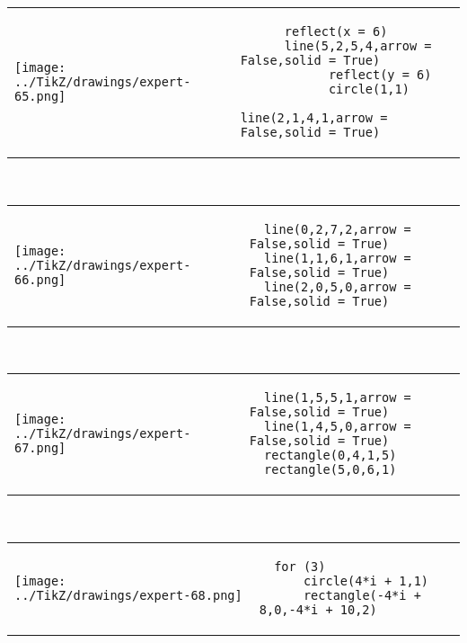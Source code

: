             \begin{tabular}{ll}
    \texttt{[image: ../TikZ/drawings/expert-65.png]}&
    
        \begin{minipage}{10cm}
        \begin{verbatim}
      reflect(x = 6)
      line(5,2,5,4,arrow = False,solid = True)
            reflect(y = 6)
            circle(1,1)
            line(2,1,4,1,arrow = False,solid = True)
        \end{verbatim}
\end{minipage}

    \end{tabular}        
            \\

            \begin{tabular}{ll}
    \texttt{[image: ../TikZ/drawings/expert-66.png]}&
    
        \begin{minipage}{10cm}
        \begin{verbatim}
  line(0,2,7,2,arrow = False,solid = True)
  line(1,1,6,1,arrow = False,solid = True)
  line(2,0,5,0,arrow = False,solid = True)
        \end{verbatim}
\end{minipage}

    \end{tabular}        
            \\

            \begin{tabular}{ll}
    \texttt{[image: ../TikZ/drawings/expert-67.png]}&
    
        \begin{minipage}{10cm}
        \begin{verbatim}
  line(1,5,5,1,arrow = False,solid = True)
  line(1,4,5,0,arrow = False,solid = True)
  rectangle(0,4,1,5)
  rectangle(5,0,6,1)
        \end{verbatim}
\end{minipage}

    \end{tabular}        
            \\

            \begin{tabular}{ll}
    \texttt{[image: ../TikZ/drawings/expert-68.png]}&
    
        \begin{minipage}{10cm}
        \begin{verbatim}
  for (3)
      circle(4*i + 1,1)
      rectangle(-4*i + 8,0,-4*i + 10,2)
        \end{verbatim}
\end{minipage}

    \end{tabular}        
            \\

